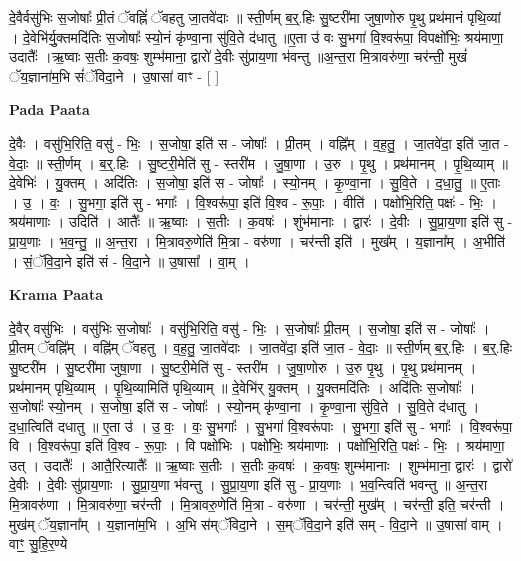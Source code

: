 \documentclass[17pt]{extarticle}
\begin{document}
दे॒वैर्वसु॑भिः स॒जोषाः᳚ प्री॒तं ॅवह्निं॑ ॅवहतु जा॒तवे॑दाः ॥ स्ती॒र्णम् ब॒र्॒.हिः सु॒ष्टरी॑मा जुषा॒णोरु पृ॒थु प्रथ॑मानं पृथि॒व्यां । दे॒वेभि॑र्यु॒क्तमदि॑तिः स॒जोषाः᳚ स्यो॒नं कृ॑ण्वा॒ना सु॑वि॒ते द॑धातु ॥ए॒ता उ॑ वः सु॒भगा॑ वि॒श्वरू॑पा॒ विपक्षो॑भिः॒ श्रय॑माणा॒ उदातैः᳚ ।ऋ॒ष्वाः स॒तीः क॒वषः॒ शुम्भ॑माना॒ द्वारो॑ दे॒वीः सु॑प्राय॒णा भ॑वन्तु ॥अ॒न्त॒रा मि॒त्रावरु॑णा॒ चर॑न्ती॒ मुखं॑ ॅय॒ज्ञाना॑म॒भि सं॑ॅविदा॒ने । उ॒षासा॑ वाꣳ - [  ] \newline

\textbf{Pada Paata} \newline

दे॒वैः । वसु॑भि॒रिति॒ वसु॑ - भिः॒ । स॒जोषा॒ इति॑ स - जोषाः᳚ । प्री॒तम् । वह्नि᳚म् । व॒ह॒तु॒ । जा॒तवे॑दा॒ इति॑ जा॒त - वे॒दाः॒ ॥ स्ती॒र्णम् । ब॒र्॒.हिः । सु॒ष्टरी॒मेति॑ सु - स्तरी॑म । जु॒षा॒णा । उ॒रु । पृ॒थु । प्रथ॑मानम् । पृ॒थि॒व्याम् ॥ दे॒वेभिः॑ । यु॒क्तम् । अदि॑तिः । स॒जोषा॒ इति॑ स - जोषाः᳚ । स्यो॒नम् । कृ॒ण्वा॒ना । सु॒वि॒ते । द॒धा॒तु॒ ॥ ए॒ताः । उ॒ । वः॒ । सु॒भगा॒ इति॑ सु - भगाः᳚ । वि॒श्वरू॑पा॒ इति॑ वि॒श्व - रू॒पाः॒ । वीति॑ । पक्षो॑भि॒रिति॒ पक्षः॑ - भिः॒ । श्रय॑माणाः । उदिति॑ । आतैः᳚ ॥ ऋ॒ष्वाः । स॒तीः । क॒वषः॑ । शुंभ॑मानाः । द्वारः॑ । दे॒वीः । सु॒प्रा॒य॒णा इति॑ सु - प्रा॒य॒णाः । भ॒व॒न्तु॒ ॥ अ॒न्त॒रा । मि॒त्रावरु॒णेति॑ मि॒त्रा - वरु॑णा । चर॑न्ती इति॑ । मुख᳚म् । य॒ज्ञाना᳚म् । अ॒भीति॑ । सं॒ॅवि॒दा॒ने इति॑ सं - वि॒दा॒ने ॥ उ॒षासा᳚ । वा॒म् ।  \newline


\textbf{Krama Paata} \newline

दे॒वैर् वसु॑भिः । वसु॑भिः स॒जोषाः᳚ । वसु॑भि॒रिति॒ वसु॑ - भिः॒ । स॒जोषाः᳚ प्री॒तम् । स॒जोषा॒ इति॑ स - जोषाः᳚ । प्री॒तम् ॅवह्नि᳚म् । वह्नि॑म् ॅवहतु । व॒ह॒तु॒ जा॒तवे॑दाः । जा॒तवे॑दा॒ इति॑ जा॒त - वे॒दाः॒ ॥ स्ती॒र्णम् ब॒र्॒.हिः । ब॒र्॒.हिः सु॒ष्टरी॑म । सु॒ष्टरी॑मा जुषा॒णा । सु॒ष्टरी॒मेति॑ सु - स्तरी॑म । जु॒षा॒णोरु । उ॒रु पृ॒थु । पृ॒थु प्रथ॑मानम् । प्रथ॑मानम् पृथि॒व्याम् । पृ॒थि॒व्यामिति॑ पृथि॒व्याम् ॥ दे॒वेभि॑र् यु॒क्तम् । यु॒क्तमदि॑तिः । अदि॑तिः स॒जोषाः᳚ । स॒जोषाः᳚ स्यो॒नम् । स॒जोषा॒ इति॑ स - जोषाः᳚ । स्यो॒नम् कृ॑ण्वा॒ना । कृ॒ण्वा॒ना सु॑वि॒ते । सु॒वि॒ते द॑धातु । द॒धा॒त्विति॑ दधातु ॥ ए॒ता उ॑ । उ॒ वः॒ । वः॒ सु॒भगाः᳚ । सु॒भगा॑ वि॒श्वरू॑पाः । सु॒भगा॒ इति॑ सु - भगाः᳚ । वि॒श्वरू॑पा॒ वि । वि॒श्वरू॑पा॒ इति॑ वि॒श्व - रू॒पाः॒ । वि पक्षो॑भिः । पक्षो॑भिः॒ श्रय॑माणाः । पक्षो॑भि॒रिति॒ पक्षः॑ - भिः॒ । श्रय॑माणा॒ उत् । उदातैः᳚ । आतै॒रित्यातैः᳚ ॥ ऋ॒ष्वाः स॒तीः । स॒तीः क॒वषः॑ । क॒वषः॒ शुम्भ॑मानाः । शुम्भ॑माना॒ द्वारः॑ । द्वारो॑ दे॒वीः । दे॒वीः सु॑प्राय॒णाः । सु॒प्रा॒य॒णा भ॑वन्तु । सु॒प्रा॒य॒णा इति॑ सु - प्रा॒य॒णाः । भ॒व॒न्त्विति॑ भवन्तु ॥ अ॒न्त॒रा मि॒त्रावरु॑णा । मि॒त्रावरु॑णा॒ चर॑न्ती । मि॒त्रावरु॒णेति॑ मि॒त्रा - वरु॑णा । चर॑न्ती॒ मुख᳚म् । चर॑न्ती॒ इति॒ चर॑न्ती । मुख॑म् ॅय॒ज्ञाना᳚म् । य॒ज्ञाना॑म॒भि । अ॒भि स॑म्ॅविदा॒ने । स॒म्ॅवि॒दा॒ने इति॑ सम् - वि॒दा॒ने ॥ उ॒षासा॑ वाम् । वाꣳ॒॒ सु॒हि॒र॒ण्ये \newline
\end{document}
